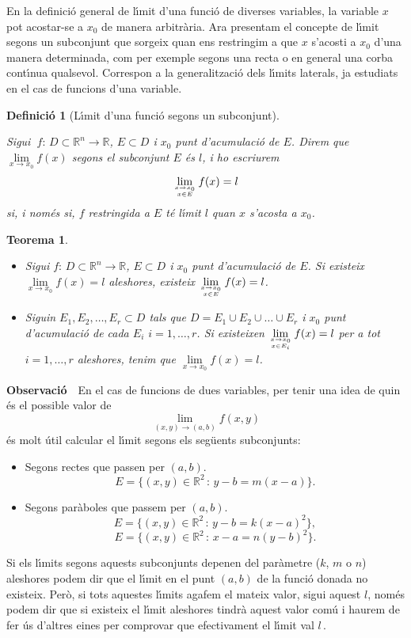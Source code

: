 \documentclass[12pt]{article}
\newcommand{\observacio}{\textbf{Observaci{\'o}}\ \ }
\newtheorem{definicio}{Definici{\'o}}[subsection]
\newtheorem{teorema}{Teorema}[subsection]
\newcommand{\R}{\mathbb{R}}
\begin{document}
\vspace{0.3cm}
En la definici{\'o} general de l{\'\i}mit d'una funci{\'o} de diverses variables,
la variable $x$ pot acostar-se a $x_0$ de manera arbitr{\`a}ria. Ara presentam el
concepte de l{\'\i}mit segons un  subconjunt que sorgeix quan ens
restringim a que $x$ s'acosti a $x_0$ d'una manera determinada, com per exemple
segons una recta o en general una corba cont{\'\i}nua qualsevol. Correspon a la generalitzaci{\'o} dels l{\'\i}mits laterals, ja estudiats en el cas de funcions d'una variable.

\vspace{0.4cm}
\begin{definicio}[L{\'\i}mit d'una funci{\'o} segons un subconjunt]
$\ $

\noindent Sigui $\ f:\, D\subset \R^n \longrightarrow \R$, $E\subset D$ i
$x_0$ punt d'acumulaci{\'o} de $E$. Direm que $\lim\limits_{x\to
x_0} f(x)$ segons el subconjunt $E$ {\'e}s $l$, i ho escriurem
$$\lim\limits_{x\to x_0\atop x\in E} f(x)=l$$
 si, i nom{\'e}s si, $f$ restringida a $E$ t{\'e} l{\'\i}mit $l$
quan $x$ s'acosta a $x_0$.
\end{definicio}

\vspace{0.4cm}
\begin{teorema}
$\ $
\begin{itemize}
\item[a)] Sigui $f:\, D\subset \R^n \longrightarrow \R$, $E\subset D$ i
$x_0$ punt d'acumulaci{\'o} de $E$. Si existeix  $\lim\limits_{x\to
x_0} f(x)=l$ aleshores, existeix $\lim\limits_{x\to x_0\atop x\in
E} f(x)=l$.
\item[b)] Siguin $E_1,E_2,\ldots ,E_r\subset D$ tals que
$D=E_1\cup E_2\cup\ldots\cup E_r$ i $x_0$ punt d'acumulaci{\'o} de
cada $E_i$ $i=1,\ldots ,r$. Si existeixen  $\lim\limits_{x\to
x_0\atop x\in E_i} f(x)=l$ per a tot $i=1,\ldots ,r$ aleshores,
tenim que  $\lim\limits_{x\to x_0} f(x)=l$.
\end{itemize}
\end{teorema}

\vspace{0.4cm}
\observacio En el cas de funcions de dues variables, per tenir una idea de quin {\'e}s el possible valor de
$$\lim\limits_{(x,y)\to (a,b)} f(x,y)$$
 {\'e}s molt {\'u}til  calcular el
l{\'\i}mit segons els seg{\"u}ents subconjunts:

\begin{itemize}
\item[1.-] Segons rectes que passen per $(a,b)$.
\[
E=\{ (x,y)\in\R^2\,:\, y-b=m(x-a)\}.
\]
\item[2.-] Segons par{\`a}boles que passem per $(a,b)$.
\[
E=\{ (x,y)\in\R^2\,:\, y-b=k(x-a)^2\},
\]
\[
E=\{ (x,y)\in\R^2\,:\, x-a=n (y-b)^2\}.
\]
\end{itemize}
Si els l{\'\i}mits segons aquests subconjunts depenen del
par{\`a}metre ($k$, $m$ o $n$) aleshores podem dir que el l{\'\i}mit en
el punt $(a,b)$ de la funci{\'o} donada no existeix. Per{\`o}, si tots
aquestes l{\'\i}mits agafem el mateix valor, sigui aquest $l$,
nom{\'e}s podem dir que si existeix el l{\'\i}mit aleshores tindr{\`a} aquest valor com{\'u} i haurem de
fer {\'u}s d'altres eines per comprovar que efectivament el l{\'\i}mit val $l\,.$
\end{document}
